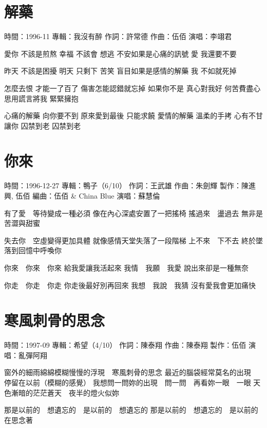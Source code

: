 \documentclass[UTF8,a4paper,oneside,twocolumn,12pt]{ctexbook}
\newcommand{\infopair}[2]{\textbullet #1：#2}
\newcommand{\zc}[1][伍佰]{\infopair{作詞}{#1}}
\newcommand{\zq}[1][伍佰]{\infopair{作曲}{#1}}
\newcommand{\bq}[1][伍佰]{\infopair{編曲}{#1}}
\newcommand{\zj}[1]{\infopair{專輯}{#1}}
\newcommand{\zz}[1]{\infopair{製作}{#1}}
\newcommand{\sj}[1]{\infopair{時間}{#1}}
\newenvironment{info}{\begin{flushleft}\kaishu
	}
	{\end{flushleft}\normalsize\yahei\par}
\newenvironment{lyric}{
	}
{}
\begin{document}
\section{解藥}
\begin{info}
	\sj{1996-11}
	\zj{我沒有醉}
	\zc[許常德]
	\zq
	\infopair{演唱}{李翊君}
\end{info}
\begin{lyric}
	愛你 不該是煎熬 幸福 不該會 想逃
	不安如果是心痛的訊號 愛 我還要不要

	昨天 不該是困擾 明天 只剩下 苦笑
	盲目如果是感情的解藥 我 不如就死掉

	怎麼去恨 才能一了百了 傷害怎能認錯就忘掉
	如果你不是 真心對我好 何苦費盡心思用謊言將我 緊緊擁抱

	心痛的解藥 向你要不到 原來愛到最後 只能求饒
	愛情的解藥 溫柔的手拷 心有不甘讓你 囚禁到老 囚禁到老
\end{lyric}

\section{你來}
\begin{info}
	\sj{1996-12-27}
	\zj{鴨子（6/10）}
	\zc[王武雄]
	\zq[朱劍輝]
	\zz{陳進興, 伍佰}
	\bq[伍佰 \& China Blue]
	\infopair{演唱}{蘇慧倫}
\end{info}
\begin{lyric}
	有了愛　等待變成一種必須
	像在內心深處安置了一把搖椅
	搖過來　盪過去
	無非是苦澀與甜蜜

	失去你　空虛變得更加具體
	就像感情天堂失落了一段階梯
	上不來　下不去
	終於墜落到回憶中呼喚你

	你來　你來　你來
	給我愛讓我活起來
	我情　我願　我愛
	說出來卻是一種無奈

	你走　你走　你走
	你走後最好別再回來
	我想　我說　我猜
	沒有愛我會更加痛快
\end{lyric}

\section{寒風刺骨的思念}
\begin{info}
	\sj{1997-09}
	\zj{希望（4/10）}
	\zc[陳泰翔]
	\zq[陳泰翔]
	\zz{伍佰}
	\infopair{演唱}{亂彈阿翔}
\end{info}
\begin{lyric}
	窗外的細雨綿綿模糊慢慢的浮現　寒風刺骨的思念
	最近的腦袋經常莫名的出現　停留在以前（模糊的感覺）
	我想問一問妳的出現　問一問　再看妳一眼　一眼
	天色漸暗的茫茫蒼天　夜半的燈火似妳

	那是以前的　想遺忘的　是以前的　想遺忘的
	那是以前的　想遺忘的　是以前的　在思念著
\end{lyric}
\end{document}

